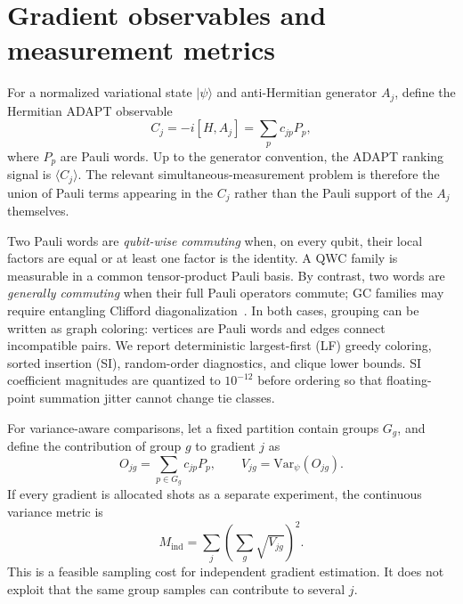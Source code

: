 \documentclass[aps,pra,twocolumn,superscriptaddress,nofootinbib,floatfix]{revtex4-2}
\newcommand{\Mind}{M_{\mathrm{ind}}}
\begin{document}
\section{Gradient observables and measurement metrics}

For a normalized variational state $|\psi\rangle$ and anti-Hermitian generator $A_j$, define the Hermitian ADAPT observable
\begin{equation}
 C_j=-i[H,A_j]=\sum_{p} c_{jp}P_p,
 \label{eq:gradientobs}
\end{equation}
where $P_p$ are Pauli words. Up to the generator convention, the ADAPT ranking signal is $\langle C_j\rangle$. The relevant simultaneous-measurement problem is therefore the union of Pauli terms appearing in the $C_j$ rather than the Pauli support of the $A_j$ themselves.

Two Pauli words are \emph{qubit-wise commuting} when, on every qubit, their local factors are equal or at least one factor is the identity. A QWC family is measurable in a common tensor-product Pauli basis. By contrast, two words are \emph{generally commuting} when their full Pauli operators commute; GC families may require entangling Clifford diagonalization~\cite{yen2020measuring,verteletskyi2020mcc}. In both cases, grouping can be written as graph coloring: vertices are Pauli words and edges connect incompatible pairs. We report deterministic largest-first (LF) greedy coloring, sorted insertion (SI), random-order diagnostics, and clique lower bounds. SI coefficient magnitudes are quantized to $10^{-12}$ before ordering so that floating-point summation jitter cannot change tie classes.

For variance-aware comparisons, let a fixed partition contain groups $G_g$, and define the contribution of group $g$ to gradient $j$ as
\begin{equation}
 O_{jg}=\sum_{p\in G_g}c_{jp}P_p,
 \qquad
 V_{jg}=\mathrm{Var}_{\psi}(O_{jg}).
 \label{eq:groupvar}
\end{equation}
If every gradient is allocated shots as a separate experiment, the continuous variance metric is
\begin{equation}
 \Mind=\sum_j\left(\sum_g\sqrt{V_{jg}}\right)^2.
 \label{eq:mind}
\end{equation}
This is a feasible sampling cost for independent gradient estimation. It does not exploit that the same group samples can contribute to several $j$.
\end{document}

